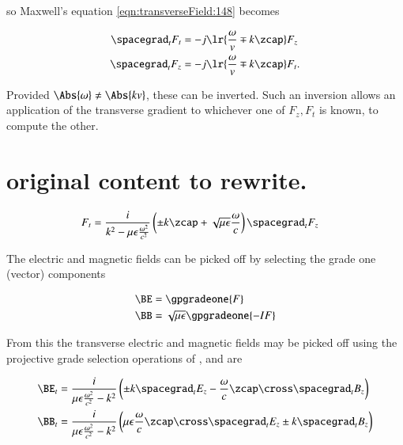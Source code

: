 so Maxwell's equation \cref{eqn:transverseField:148} becomes

\begin{dmath}\label{eqn:transverseField:228}
\begin{aligned}
\spacegrad_t F_t &= - j \lr{ \frac{\omega}{v} \mp k \zcap } F_z \\
\spacegrad_t F_z &= - j \lr{ \frac{\omega}{v} \mp k \zcap } F_t.
\end{aligned}
\end{dmath}

Provided \( \Abs{\omega} \ne \Abs{kv} \), these can be inverted.  Such an inversion allows an application of the transverse gradient to whichever one
of \( F_z, F_t \) is known, to compute the other.


\section{original content to rewrite.}

\begin{equation}\label{eqn:transverseField:48}
\begin{aligned}
F_t &= \frac{i}{k^2 - \mu\epsilon\frac{\omega^2}{c^2}} \left( \pm k \zcap + \sqrt{\mu\epsilon}\frac{\omega}{c}\right) \spacegrad_t F_z
\end{aligned}
\end{equation}

The electric and magnetic fields can be picked off by selecting the grade one (vector) components

\begin{equation}\label{eqn:transverseField:8}
\begin{aligned}
\BE &= \gpgradeone{F} \\
\BB &= \sqrt{\mu\epsilon} \gpgradeone{-I F}
\end{aligned}
\end{equation}

From this the transverse electric and magnetic fields may be picked off using the projective grade selection operations of , and are

\begin{equation}\label{eqn:transverseField:68}
\begin{aligned}
\BE_t &= \frac{i}{\mu\epsilon\frac{\omega^2}{c^2} -k^2} \left( \pm k \spacegrad_t E_z - \frac{\omega}{c} \zcap \cross \spacegrad_t B_z \right) \\
\BB_t &= \frac{i}{\mu\epsilon\frac{\omega^2}{c^2} -k^2} \left( {\mu\epsilon}\frac{\omega}{c} \zcap \cross \spacegrad_t E_z \pm k \spacegrad_t B_z \right)
\end{aligned}
\end{equation}
